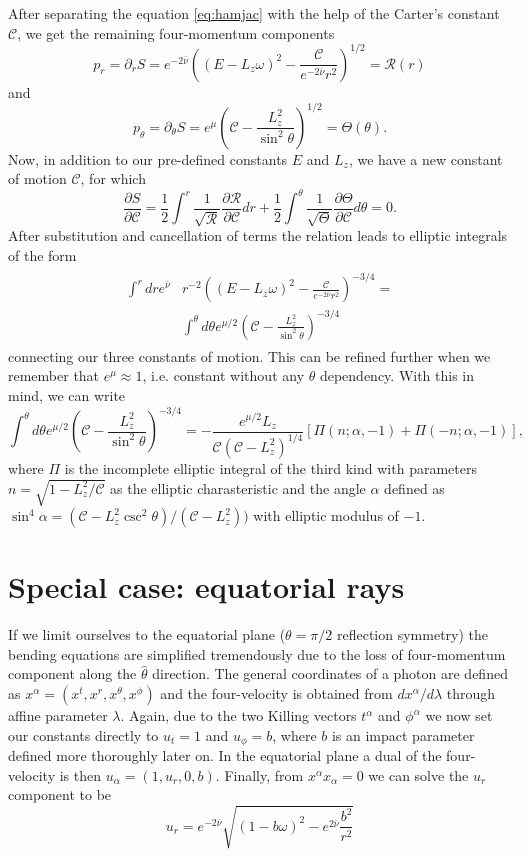 \documentclass[iop, usenatbib]{emulateapj}
\newcommand{\be}{\begin{equation}}
\newcommand{\ee}{\end{equation}}
\newcommand{\pd}{\ensuremath{\partial}} %
\newcommand{\Ca}{\ensuremath{\mathcal{C}}}
\newcommand{\nub}{\ensuremath{\bar{\nu}}}
\begin{document}
After separating the equation \eqref{eq:hamjac} with the help of the Carter's constant $\Ca$, we get the remaining four-momentum components
\be\label{eq:pr}
p_r = \pd_r S = e^{-2\nub} \left( (E-L_z \omega)^2 - \frac{\mathcal{C}}{e^{-2\nub} r^2} \right)^{1/2} = \mathcal{R}(r)
\ee
and
\be\label{eq:ptheta}
p_{\theta} = \pd_{\theta} S = e^{\mu} \left( \mathcal{C} - \frac{L_z^2}{\sin^2 \theta} \right)^{1/2} = \Theta(\theta).
\ee
Now, in addition to our pre-defined constants $E$ and $L_z$, we have a new constant of motion $\Ca$, for which
\be
\frac{\pd S}{\pd \mathcal{C}} = \frac{1}{2} \int^r \frac{1}{\sqrt{\mathcal{R}}} \frac{\pd \mathcal{R}}{\pd \mathcal{C}} dr + \frac{1}{2} \int^{\theta} \frac{1}{\sqrt{\Theta}} \frac{\pd \Theta}{\pd \mathcal{C}} d\theta = 0.
\ee 
After substitution and cancellation of terms the relation leads to elliptic integrals of the form
\begin{align}\begin{split}\label{eq:Lz_C_rel}
 \int^r dr e^{\nub} & r^{-2} \left( (E-L_z\omega)^2 - \frac{\mathcal{C}}{e^{-2\nub} r^2} \right)^{-3/4}  = \\
& \int^{\theta} d\theta e^{\mu/2} \left(\mathcal{C} - \frac{L_z^2}{\sin^2 \theta} \right)^{-3/4}
\end{split}\end{align}
connecting our three constants of motion.
This can be refined further when we remember that $e^{\mu} \approx 1$, i.e. constant without any $\theta$ dependency. 
With this in mind, we can write
\be
\int^{\theta} d\theta e^{\mu/2} \left(\mathcal{C} - \frac{L_z^2}{\sin^2
\theta} \right)^{-3/4} = -\frac{e^{\mu/2} L_z}{\mathcal{C} (\mathcal{C}-L_z^2)^{1/4}} [ \Pi(n; \alpha, -1)+\Pi(-n;\alpha, -1)],
\ee
where $\Pi$ is the incomplete elliptic integral of the third kind with parameters $n = \sqrt{1-L_z^2/\mathcal{C}}$ as the elliptic charasteristic and the angle $\alpha$ defined as $\sin^4 \alpha = (\mathcal{C}-L_z^2 \csc^2 \theta)/(\mathcal{C}-L_z^2))$ with elliptic modulus of $-1$.


\section{Special case: equatorial rays}
If we limit ourselves to the equatorial plane ($\theta=\pi/2$ reflection symmetry) the bending equations are simplified tremendously due to the loss of four-momentum component along the $\hat{\theta}$ direction.
The general coordinates of a photon are defined as $x^{\alpha} = (x^{t}, x^{r}, x^{\theta}, x^{\phi})$ and the four-velocity is obtained from $dx^{\alpha}/d\lambda$ through affine parameter $\lambda$.
Again, due to the two Killing vectors $t^{\alpha}$ and $\phi^{\alpha}$ we now set our constants directly to $u_{t} = 1$ and $u_{\phi} = b$, where $b$ is an impact parameter defined more thoroughly later on.
In the equatorial plane a dual of the four-velocity is then $u_{\alpha} = (1, u_{r}, 0, b)$.
Finally, from $x^{\alpha}x_{\alpha} = 0$ we can solve the $u_{r}$ component to be
\be
u_{r} = e^{-2\nub}\sqrt{(1-b\omega)^2 - e^{2\nub}\frac{b^2}{r^2}} 
\ee
\end{document}
